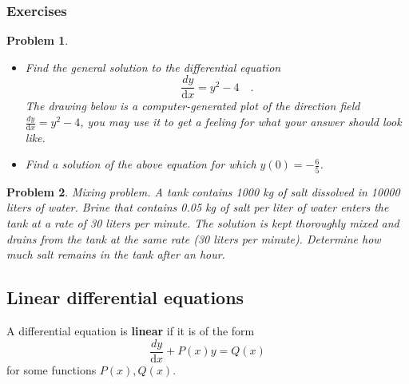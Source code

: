 \documentclass[12pt]{book}
\newcommand{\diff}{\text{d}}
\newtheorem{problem}{Problem}[section]
\newcommand{\optionalDisplay}[1]{}
\renewcommand{\emph}{\textbf}
\begin{document}
\subsubsection{Exercises}
\begin{problem} ~
\begin{itemize}
\item Find the general solution to the differential equation 
\[
\frac{dy}{\diff x}= y^2-4\quad .
\]
The drawing below is a computer-generated plot of the direction field  $\frac{dy}{\diff x}=y^2-4$, you may use it to get a feeling for what your answer should look like.
\item Find a solution of the above equation for which $ y(0)= -\frac{6}{5}$. 
\end{itemize}

\optionalDisplay{
\begin{pspicture}(-6,-6)(6,6)
\newcommand{\Dconst}{4}
\psplot[linecolor=green]{-4}{4}{1 \Dconst\space 2.718281828 4 x mul exp mul sub 1 \Dconst\space 2.718281828 4 x mul exp mul add div 2 mul} 

\psaxes{<->}(0,0)(-6,-2)(6,6)
\rput (5,5){The direction field  $\frac{dy}{\diff x}=y^2-4$}
  \psset{arrows=->}
  \multido{\ra=-4+0.5}{17}{%
    \multido{\rb=-4+0.5}{17}{%
      \pstVerb{/xC \ra\space def
               /yC \rb\space def
               /F  yC yC mul 4 sub \space def
}
\psdot[linecolor=red!60](! xC yC)
\psline[linecolor=blue](! xC F ATAN 57.295 mul cos 0.2 mul sub yC F ATAN 57.295 mul sin 0.2 mul sub)(! xC F ATAN 57.295 mul cos 0.2 mul add yC F ATAN 57.295 mul sin 0.2 mul add )
}}
\end{pspicture}
} %
\end{problem}
\begin{problem}
Mixing problem. A tank contains 1000 kg of salt dissolved in 10000 liters of water. Brine that contains 0.05 kg of salt per liter of water enters the tank at a rate of 30 liters per minute. The solution is kept thoroughly mixed and drains from the tank at the same rate (30 liters per minute). Determine how much salt remains in the tank after an hour.
\end{problem}
\subsection{Linear differential equations}
A differential equation is \emph{linear} if it is of the form 
\begin{equation}\label{eqDFQlinear}
\frac{dy}{\diff x} + P(x)y=Q(x)
\end{equation}
for some functions $P(x),Q(x)$.
\end{document}

